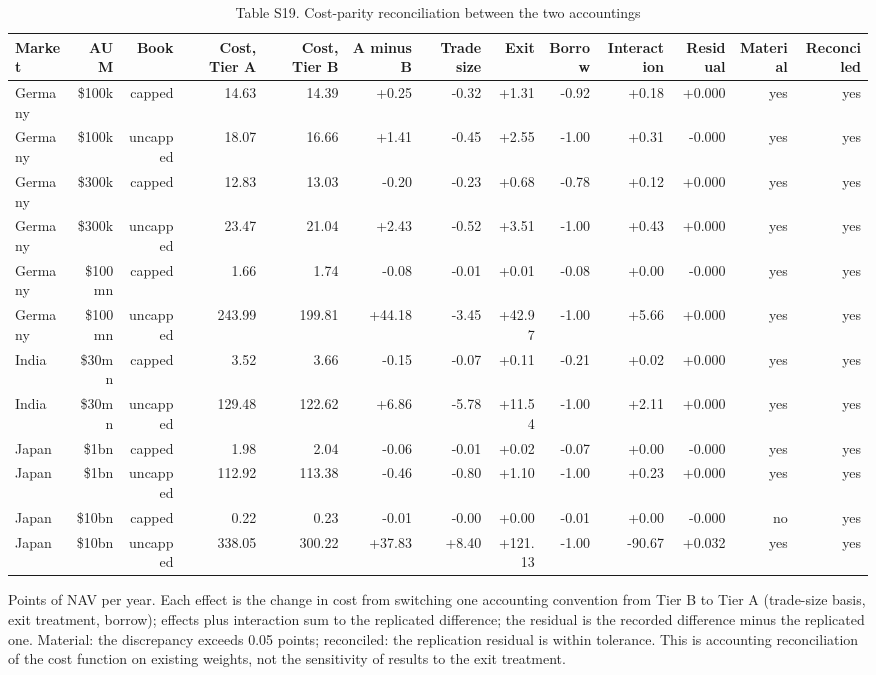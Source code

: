 \begin{table}[t]
\centering
\small
\caption{Table S19. Cost-parity reconciliation between the two accountings}
\label{tab:s19}
\begin{tabular}{lrrrrrrrrrrrr}
\toprule
Market & AUM & Book & Cost, Tier A & Cost, Tier B & A minus B & Trade size & Exit & Borrow & Interaction & Residual & Material & Reconciled \\
\midrule
Germany & \$100k & capped & 14.63 & 14.39 & +0.25 & -0.32 & +1.31 & -0.92 & +0.18 & +0.000 & yes & yes \\
Germany & \$100k & uncapped & 18.07 & 16.66 & +1.41 & -0.45 & +2.55 & -1.00 & +0.31 & -0.000 & yes & yes \\
Germany & \$300k & capped & 12.83 & 13.03 & -0.20 & -0.23 & +0.68 & -0.78 & +0.12 & +0.000 & yes & yes \\
Germany & \$300k & uncapped & 23.47 & 21.04 & +2.43 & -0.52 & +3.51 & -1.00 & +0.43 & +0.000 & yes & yes \\
Germany & \$100mn & capped & 1.66 & 1.74 & -0.08 & -0.01 & +0.01 & -0.08 & +0.00 & -0.000 & yes & yes \\
Germany & \$100mn & uncapped & 243.99 & 199.81 & +44.18 & -3.45 & +42.97 & -1.00 & +5.66 & +0.000 & yes & yes \\
India & \$30mn & capped & 3.52 & 3.66 & -0.15 & -0.07 & +0.11 & -0.21 & +0.02 & +0.000 & yes & yes \\
India & \$30mn & uncapped & 129.48 & 122.62 & +6.86 & -5.78 & +11.54 & -1.00 & +2.11 & +0.000 & yes & yes \\
Japan & \$1bn & capped & 1.98 & 2.04 & -0.06 & -0.01 & +0.02 & -0.07 & +0.00 & -0.000 & yes & yes \\
Japan & \$1bn & uncapped & 112.92 & 113.38 & -0.46 & -0.80 & +1.10 & -1.00 & +0.23 & +0.000 & yes & yes \\
Japan & \$10bn & capped & 0.22 & 0.23 & -0.01 & -0.00 & +0.00 & -0.01 & +0.00 & -0.000 & no & yes \\
Japan & \$10bn & uncapped & 338.05 & 300.22 & +37.83 & +8.40 & +121.13 & -1.00 & -90.67 & +0.032 & yes & yes \\
\bottomrule
\end{tabular}
\par\vspace{2pt}
\parbox{\textwidth}{\footnotesize Points of NAV per year. Each effect is the change in cost from switching one accounting convention from Tier B to Tier A (trade-size basis, exit treatment, borrow); effects plus interaction sum to the replicated difference; the residual is the recorded difference minus the replicated one. Material: the discrepancy exceeds 0.05 points; reconciled: the replication residual is within tolerance. This is accounting reconciliation of the cost function on existing weights, not the sensitivity of results to the exit treatment.}
\end{table}
